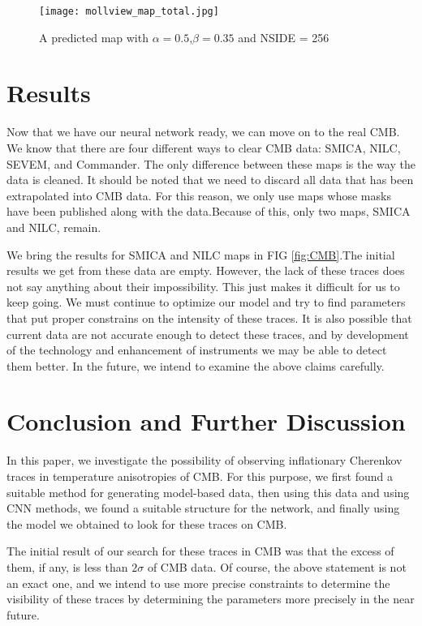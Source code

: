 \documentclass[10pt, english, pra,aps,twocolumn,floatfix,superscriptaddress]{revtex4-2}
\begin{document}
 \begin{figure}
    \centering
    \texttt{[image: mollview\_map\_total.jpg]}
    \caption{A predicted map with $\alpha=0.5$,$\beta=0.35$ and NSIDE = 256}
    \label{fig:map_predict}
\end{figure}
 
\section{Results}
Now that we have our neural network ready, we can move on to the real CMB. We know that there are four different ways to clear CMB data: SMICA, NILC, SEVEM, and Commander\cite{collaboration2018planck}. The only difference between these maps is the way the data is cleaned. It should be noted that we need to discard all data that has been extrapolated into CMB data. For this reason, we only use maps whose masks have been published along with the data.Because of this, only two maps, SMICA and NILC, remain.

We bring the results for SMICA and NILC maps in FIG \ref{fig:CMB}.The initial results we get from these data are empty. However, the lack of these traces does not say anything about their impossibility. This just makes it difficult for us to keep going. We must continue to optimize our model and try to find parameters that put proper constrains on the intensity of these traces. It is also possible that current data are not accurate enough to detect these traces, and by development of the technology and enhancement of instruments we may be able to detect them better. In the future, we intend to examine the above claims carefully.

\section{Conclusion and Further Discussion}
In this paper, we investigate the possibility of observing inflationary Cherenkov traces in temperature anisotropies of CMB. For this purpose, we first found a suitable method for generating model-based data, then using this data and using CNN methods, we found a suitable structure for the network, and finally using the model we obtained to look for these traces on CMB. 

The initial result of our search for these traces in CMB was that the excess of them, if any, is less than $2\sigma$ of CMB data. Of course, the above statement is not an exact one, and we intend to use more precise constraints to determine the visibility of these traces by determining the parameters more precisely in the near future.
\end{document}
